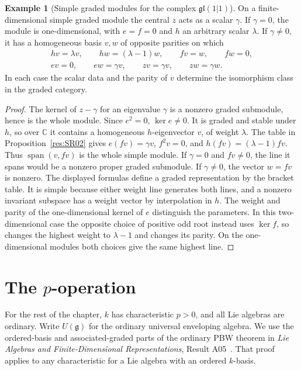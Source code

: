 \documentclass[11pt,oneside,openany]{book}
\theoremstyle{definition}
\newtheorem{example}[theorem]{Example}
\theoremstyle{remark}
\begin{document}
\begin{example}[Simple graded modules for the complex \(\mathfrak{gl}(1|1)\)]
\label{res:SR04}
On a finite-dimensional simple graded module the central \(z\)
acts as a scalar \(\gamma\). If \(\gamma=0\), the module is
one-dimensional, with \(e=f=0\) and \(h\) an arbitrary scalar
\(\lambda\). If \(\gamma\ne0\), it has a homogeneous basis
\(v,w\) of opposite parities on which
\[
\begin{gathered}
 hv=\lambda v,\qquad hw=(\lambda-1)w,\qquad
 fv=w,\qquad fw=0,\\
 ev=0,\qquad ew=\gamma v,\qquad
 zv=\gamma v,\qquad zw=\gamma w .
\end{gathered}
\]
In each case the scalar data and the parity of \(v\)
determine the isomorphism class in the graded category.
\end{example}

\begin{proof}
The kernel of \(z-\gamma\) for an eigenvalue \(\gamma\)
is a nonzero graded submodule, hence is the whole module.
Since \(e^2=0\), \(\ker e\ne0\). It is graded and
stable under \(h\), so over \(\mathbb C\) it contains a
homogeneous \(h\)-eigenvector \(v\), of weight \(\lambda\).
The table in Proposition~\ref{res:SR02} gives
\(e(fv)=\gamma v\), \(f^2v=0\), and \(h(fv)=(\lambda-1)fv\).
Thus \(\operatorname{span}(v,fv)\) is the whole simple module.
If \(\gamma=0\) and \(fv\ne0\), the line it spans would be a
nonzero proper graded submodule. If \(\gamma\ne0\), the
vector \(w=fv\) is nonzero. The displayed formulas define
a graded representation by the bracket table. It is simple
because either weight line generates both lines, and a nonzero
invariant subspace has a weight vector by interpolation in \(h\).
The weight and parity of the one-dimensional kernel of \(e\)
distinguish the parameters. In this two-dimensional case the
opposite choice of positive odd root instead uses \(\ker f\),
so changes the highest weight to \(\lambda-1\) and changes
its parity. On the one-dimensional modules both choices
give the same highest line.
\end{proof}

\section{The \texorpdfstring{\(p\)}{p}-operation}

For the rest of the chapter, \(k\) has characteristic \(p>0\),
and all Lie algebras are ordinary. Write \(U(\mathfrak g)\)
for the ordinary universal enveloping algebra. We use the
ordered-basis and associated-graded parts of the ordinary PBW
theorem in \emph{Lie Algebras and Finite-Dimensional
Representations}, Result A05~\cite[PDF pp.~8--9]{mg-lie}.
That proof applies to any characteristic for a Lie algebra
with an ordered \(k\)-basis.
\end{document}
